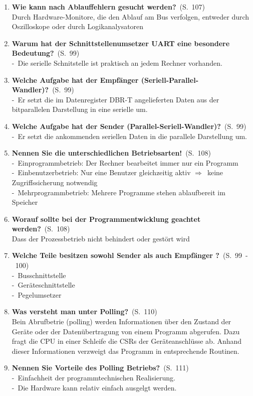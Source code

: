 \documentclass[a4paper,12pt]{article}
\newcommand{\question}[3]{\pagebreak[3]\item {\textbf{#1?}}\ (S.\ #2)#3}
\newcommand{\statement}[3]{\pagebreak[3]\item {\textbf{#1!}}\ (S.\ #2)#3}
\newcommand{\catchword}[1]{\\-\ #1}
\newcommand{\normaltext}[1]{\\#1}
\newcommand{\resultol}[1]{ $\Rightarrow$\ #1}
\newcommand{\page}[1]{#1}
\newcommand{\pages}[2]{#1\ -\ #2}
\begin{document}
\begin{enumerate}
  \question{Wie kann nach Ablauffehlern gesucht werden}{\page{107}}
  {
    \normaltext{Durch Hardware-Monitore, die den Ablauf am Bus verfolgen, entweder durch
                Oszilloskope oder durch Logikanalysatoren}
  }

  \question{Warum hat der Schnittstellenumsetzer UART eine besondere Bedeutung}{\page{99}}
  {
    \catchword{Die serielle Schnitstelle ist praktisch an jedem Rechner vorhanden.}
  }
  
    \question{Welche Aufgabe hat der Empfänger (Seriell-Parallel-Wandler)}{\page{99}}
  {
    \catchword{Er setzt die im Datenregister DBR-T angelieferten Daten aus der bitparallelen 
    Darstellung in eine serielle um.}
  }
  
  \question{Welche Aufgabe hat der Sender (Parallel-Seriell-Wandler)}{\page{99}}
  {
    \catchword{Er setzt die ankommenden seriellen Daten in die parallele Darstellung um.}
  }



  \statement{Nennen Sie die unterschiedlichen Betriebsarten}{\page{108}}
  {
    \catchword{Einprogrammbetrieb: Der Rechner bearbeitet immer nur ein Programm}
    \catchword{Einbenutzerbetrieb: Nur eine Benutzer gleichzeitig aktiv
               \resultol{keine Zugriffssicherung notwendig}}
    \catchword{Mehrprogrammbetrieb: Mehrere Programme stehen ablaufbereit im Speicher}
  }

  \question{Worauf sollte bei der Programmentwicklung geachtet werden}{\page{108}}
  {
    \normaltext{Dass der Prozessbetrieb nicht behindert oder gestört wird}
  }



  \question{Welche Teile besitzen sowohl Sender als auch Empfänger }{\pages{99}{100}}
  {
    \catchword{Busschnittstelle}
    \catchword{Geräteschnittstelle}
    \catchword{Pegelumsetzer}
  }
  
    \question{Was versteht man unter Polling}{\page{110}}
  {
    \normaltext{Bein Abrufbetrie (polling) werden Informationen über den Zustand der Geräte
    oder der Datenübertragung von einem Programm abgerufen. Dazu fragt die CPU in einer Schleife
    die CSRs der Geräteanschlüsse ab. Anhand dieser Informationen verzweigt das Programm in 
    entsprechende Routinen.}
  }
  
    \question{Nennen Sie Vorteile des Polling Betriebs}{\page{111}}
  {
    \catchword{Einfachheit der programmtechnischen Realisierung.}
    \catchword{Die Hardware kann relativ einfach ausgelgt werden.}
  }
  

\end{enumerate}
\end{document}
